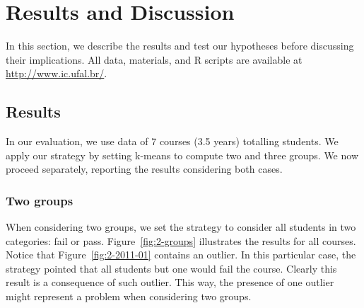 \section{Results and Discussion}

In this section, we describe the results and test our hypotheses before discussing their implications. All data, materials, and R scripts are available at \url{http://www.ic.ufal.br/}.

\subsection{Results}

In our evaluation, we use data of 7 courses (3.5 years) totalling \totalStudents students. We apply our strategy by setting k-means to compute two and three groups. We now proceed separately, reporting the results considering both cases.

\subsubsection{Two groups}

When considering two groups, we set the strategy to consider all students in two categories: fail or pass. Figure~\ref{fig:2-groups} illustrates the results for all courses. Notice that Figure~\ref{fig:2-2011-01} contains an outlier. In this particular case, the strategy pointed that all students but one would fail the course. Clearly this result is a consequence of such outlier. This way, the presence of one outlier might represent a problem when considering two groups.

